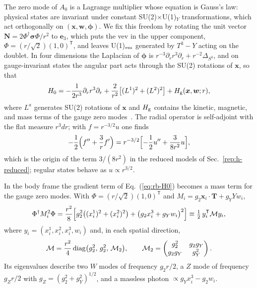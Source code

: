 The zero mode of $A_0$ is a Lagrange multiplier whose equation is Gauss's law: physical states are invariant under constant SU(2)$\times$U(1)$_Y$ transformations, which act orthogonally on $(\bm x,\bm w,\bm\phi)$.
We fix this freedom by rotating the unit vector $\bm N=2\Phi^\dagger\bm\sigma\Phi/r^2$ to $\bm e_3$, which puts the vev in the upper component, $\Phi=(r/\sqrt2)(1,0)^{\mathsf T}$, and leaves U(1)$_{\rm em}$ generated by $T^3-Y$ acting on the doublet.
In four dimensions the Laplacian of $\bm\phi$ is $r^{-3}\partial_rr^3\partial_r+r^{-2}\Delta_{S^3}$, and on gauge-invariant states the angular part acts through the SU(2) rotations of $\bm x$, so that
\begin{equation}
H_0=-\frac{1}{2r^3}\partial_r r^3\partial_r+\frac{2}{r^2}\bigl[(L^1)^2+(L^2)^2\bigr]+H_{\rm g}(\bm{x},\bm{w};r),
\label{eq:rb-bodyframe}
\end{equation}
where $L^a$ generates SU(2) rotations of $\bm x$ and $H_{\rm g}$ contains the kinetic, magnetic, and mass terms of the gauge zero modes~\cite{Luscher:1982ma,vanBaal:2000zc}.
The radial operator is self-adjoint with the flat measure $r^3dr$; with $f=r^{-3/2}u$ one finds
\begin{equation}
-\frac{1}{2}\Bigl(f''+\frac{3}{r}f'\Bigr)=r^{-3/2}\Bigl[-\frac12u''+\frac{3}{8r^2}u\Bigr],
\label{eq:rb-centrifugal}
\end{equation}
which is the origin of the term $3/(8r^2)$ in the reduced models of Sec.~\ref{rep:h-reduced}; regular states behave as $u\propto r^{3/2}$.

In the body frame the gradient term of Eq.~(\ref{eq:rb-H0}) becomes a mass term for the gauge zero modes.
With $\Phi=(r/\sqrt2)(1,0)^{\mathsf T}$ and $M_i=g_2\bm x_i\cdot\bm T+g_YYw_i$,
\begin{equation}
\Phi^\dagger M_i^2\Phi=\frac{r^2}{8}\Bigl[g_2^2\bigl((x_i^1)^2+(x_i^2)^2\bigr)+\bigl(g_2x_i^3+g_Yw_i\bigr)^2\Bigr]\equiv\tfrac12\,y_i^{\mathsf T}\mathcal M y_i,
\label{eq:rb-massterm}
\end{equation}
where $y_i=(x_i^1,x_i^2,x_i^3,w_i)$ and, in each spatial direction,
\begin{equation}
\mathcal M=\frac{r^2}{4}\,{\rm diag}\bigl(g_2^2,\,g_2^2,\,\mathcal M_2\bigr),\qquad
\mathcal M_2=\begin{pmatrix}g_2^2&g_2g_Y\\ g_2g_Y&g_Y^2\end{pmatrix}.
\label{eq:rb-massmatrix}
\end{equation}
Its eigenvalues describe two $W$ modes of frequency $g_2r/2$, a $Z$ mode of frequency $g_Zr/2$ with $g_Z=(g_2^2+g_Y^2)^{1/2}$, and a massless photon $\propto g_Yx_i^3-g_2w_i$.

